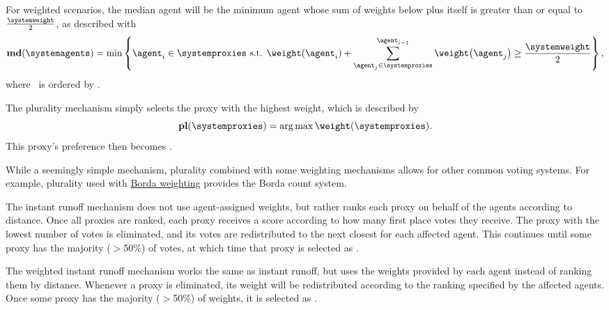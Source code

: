 For weighted scenarios, the median agent will be the minimum agent whose sum of
weights below plus itself is greater than or equal to $\frac{\systemweight}{2}$,
as described with
\begin{equation}
    \textbf{md}(\systemagents) = \min\left\{
    \agent_i \in \systemproxies \text{ s.t. }
    \weightof{\agent_i} +
    \sum_{\agent_j \in \systemproxies}^{\agent_{i - 1}} \weightof{\agent_j}
    \geq \frac{\systemweight}{2}
    \right\}
    \text{,}\label{eq:median-mechanism}
\end{equation}
where \systemproxies\ is ordered by \agenttruth.

\label{para:plurality}
The plurality mechanism simply selects the proxy with the highest weight, which is
described by
\begin{equation}
    \textbf{pl}(\systemproxies) =
    \argmax \weightof{\systemproxies}
    \text{.}\label{eq:plurality-mechanism}
\end{equation}
This proxy's preference then becomes \systemtruth.

While a seemingly simple mechanism, plurality combined with some
weighting mechanisms allows for other common voting systems.
For example, plurality used with \hyperref[para:borda]{Borda weighting}
provides the Borda count system.

\label{para:cand-instant-runoff}
The instant runoff mechanism does not use agent-assigned weights, but rather
ranks each proxy on behalf of the agents according to distance.
Once all proxies are ranked, each proxy receives a score according to how
many first place votes they receive.
The proxy with the lowest number of votes is eliminated, and its votes are
redistributed to the next closest for each affected agent.
This continues until some proxy has the majority ($>$50\%) of votes, at which
time that proxy is selected as \systemtruth.

\label{para:cand-weighted-instant-runoff}
\label{para:candidate-weighted-instant-runoff}
The weighted instant runoff mechanism works the same as instant runoff, but uses
the weights provided by each agent instead of ranking them by distance.
Whenever a proxy is eliminated, its weight will be redistributed according to
the ranking specified by the affected agents.
Once some proxy has the majority ($>$50\%) of weights, it is selected as
\systemtruth.

